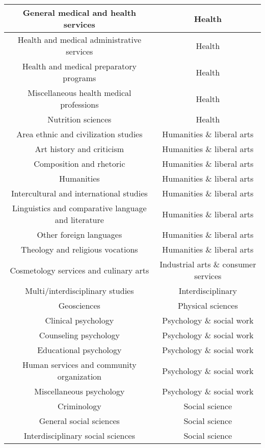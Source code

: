 \documentclass[11pt]{article}
\begin{document}
\begin{center}
\begin{longtable} {|| c c ||}
    \hline
    General medical and health services & Health \\
    \hline
    Health and medical administrative services & Health \\
    \hline
    Health and medical preparatory programs & Health \\
    \hline
    Miscellaneous health medical professions & Health \\
    \hline
    Nutrition sciences & Health \\
    \hline
    Area ethnic and civilization studies & Humanities \& liberal arts \\
    \hline
    Art history and criticism & Humanities \& liberal arts \\
    \hline
    Composition and rhetoric & Humanities \& liberal arts \\
    \hline
    Humanities & Humanities \& liberal arts \\
    \hline
    Intercultural and international studies & Humanities \& liberal arts \\
    \hline
    Linguistics and comparative language and literature & Humanities \& liberal arts \\
    \hline
    Other foreign languages & Humanities \& liberal arts \\
    \hline
    Theology and religious vocations & Humanities \& liberal arts \\
    \hline
    Cosmetology services and culinary arts & Industrial arts \& consumer services \\
    \hline
    Multi/interdisciplinary studies & Interdisciplinary \\
    \hline
    Geosciences & Physical sciences \\
    \hline
    Clinical psychology & Psychology \& social work \\
    \hline
    Counseling psychology & Psychology \& social work \\
    \hline
    Educational psychology & Psychology \& social work \\
    \hline
    Human services and community organization & Psychology \& social work \\
    \hline
    Miscellaneous psychology & Psychology \& social work \\
    \hline
    Criminology & Social science \\
    \hline
    General social sciences & Social science \\
    \hline
    Interdisciplinary social sciences & Social science \\
    \hline
\end {longtable}
\label{table:eight}
\end{center}
\end{document}
